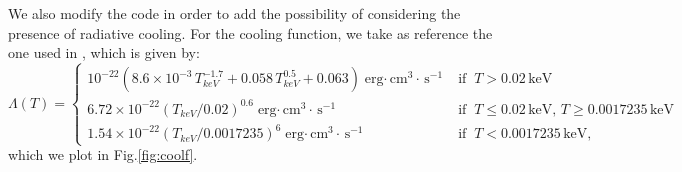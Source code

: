 \documentclass{article}
\begin{document}
We also modify the code in order to add the possibility of considering the presence of radiative cooling. For the cooling function, we take as reference the one used in \cite{sharma}, which is given by:
\begin{equation}\label{coolfu}
	\Lambda(T)=
	\begin{cases}
		10^{-22}(8.6\times 10^{-3}\,T_{keV}^{-1.7}+0.058\,T_{keV}^{0.5}+0.063)\;\text{erg$\cdot\,$cm$^3\cdot\,$s$^{-1}$} \; &\text{if} \; \;T>0.02\,\text{keV}\\
		6.72\times 10^{-22}(T_{keV}/0.02)^{0.6}\;\text{erg$\cdot\,$cm$^3\cdot\,$s$^{-1}$} \; &\text{if} \; \;T\le0.02\,\text{keV, }T\ge0.0017235\,\text{keV}\\
		1.54\times 10^{-22}(T_{keV}/0.0017235)^{6}\;\text{erg$\cdot\,$cm$^3\cdot\,$s$^{-1}$} \; &\text{if} \; \;T<0.0017235\,\text{keV},
	\end{cases}
\end{equation}
which we plot in Fig.\ref{fig:coolf}.
\end{document}

